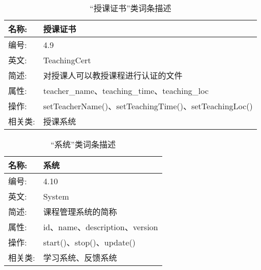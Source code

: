 \begin{table}[H]  
\caption{“授课证书”类词条描述}  
\begin{center}  
    \begin{tabular}{l p{11cm}} 
        \hline
        \quad 名称:  &  授课证书 \\
        \hline
        \quad 编号:  & 4.9 \\
        \hline
        \quad 英文:  &  TeachingCert \\
        \hline
        \quad 简述:  & 对授课人可以教授课程进行认证的文件 \\
        \hline
        \quad 属性:  & teacher\_name、teaching\_time、teaching\_loc\\
        \hline
        \quad 操作:  & setTeacherName()、setTeachingTime()、setTeachingLoc() \\
        \hline
        \quad 相关类:  & 授课系统 \\
        \hline
    \end{tabular}
\end{center}
\end{table}

\begin{table}[H]  
\caption{“系统”类词条描述}  
\begin{center}  
    \begin{tabular}{l p{11cm}} 
        \hline
        \quad 名称:  &  系统 \\
        \hline
        \quad 编号:  & 4.10 \\
        \hline
        \quad 英文:  &  System \\
        \hline
        \quad 简述:  & 课程管理系统的简称 \\
        \hline
        \quad 属性:  & id、name、description、version\\
        \hline
        \quad 操作:  & start()、stop()、update()\\
        \hline
        \quad 相关类:  & 学习系统、反馈系统 \\
        \hline
    \end{tabular}
\end{center}
\end{table}

